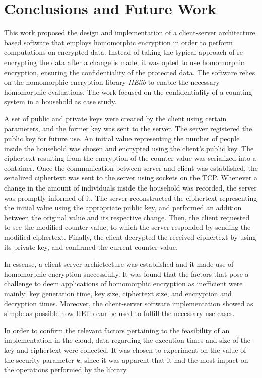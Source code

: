 \chapter{Conclusions and Future Work}
\label{conclusions}

This work proposed the design and implementation of a client-server architecture based software that employs homomorphic encryption in order to perform computations on encrypted data. Instead of taking the typical approach of re-encrypting the data after a change is made, it was opted to use homomorphic encryption, ensuring the confidentiality of the protected data. The software relies on the homomorphic encryption library \emph{HElib} to enable the necessary homomorphic evaluations. The work focused on the confidentiality of a counting system in a household as case study. 

A set of public and private keys were created by the client using certain parameters, and the former key was sent to the server. The server registered the public key for future use. An initial value representing the number of people inside the household was chosen and encrypted using the client's public key. The ciphertext resulting from the encryption of the counter value was serialized into a container. Once the communication between server and client was established, the serialized ciphertext was sent to the server using sockets on the TCP. Whenever a change in the amount of individuals inside the household was recorded, the server was promptly informed of it. The server reconstructed the ciphertext representing the initial value using the appropriate public key, and performed an addition between the original value and its respective change. Then, the client requested to see the modified counter value, to which the server responded by sending the modified ciphertext. Finally, the client decrypted the received ciphertext by using its private key, and confirmed the current counter value. 

In essense, a client-server archictecture was established and it made use of homomorphic encryption successfully. It was found that the factors that pose a challenge to deem applications of homomorphic encryption as inefficient were mainly: key generation time, key size, ciphertext size, and encryption and decryption times. Moreover, the client-server software implementation showed as simple as possible how HElib can be used to fulfill the necessary use cases. 

In order to confirm the relevant factors pertaining to the feasibility of an implementation in the cloud, data regarding the execution times and size of the key and ciphertext were collected. It was chosen to experiment on the value of the security parameter $k$, since it was apparent that it had the most impact on the operations performed by the library. 

